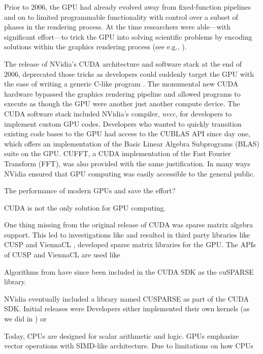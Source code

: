 \documentclass{report}
\begin{document}
Prior to 2006, the GPU had already evolved away from fixed-function pipelines and on to limited programmable functionality with control over a subset of phases in the rendering process. At the time researchers were able---with significant effort---to trick the GPU into solving scientific problems by encoding solutions within the graphics rendering process (see e.g., \cite{Harris2005,Owens2007}). 

The release of NVidia's CUDA architecture and software stack at the end of 2006, deprecated those tricks as developers could suddenly target the GPU with the ease of writing a generic C-like program \cite{CudaGuide2013}. The monumental new CUDA hardware bypassed the graphics rendering pipeline and allowed programs to execute as though the GPU were another just another compute device. The CUDA software stack included NVidia's compiler, \emph{nvcc}, for developers to implement custom GPU codes. Developers who wanted to quickly transition existing code bases to the GPU had access to the CUBLAS API since day one, which offers an implementation of the Basic Linear Algebra Subprograms (BLAS) suite on the GPU. CUFFT, a CUDA implementation of the Fast Fourier Transform (FFT), was also provided with the same justification. In many ways NVidia ensured that GPU computing was easily accessible to the general public. 


The performance of modern GPUs \cite{CudaGuide2013} and save the effort?


CUDA is not the only solution for GPU computing. 


One thing missing from the original release of CUDA was sparse matrix algebra support. 
This led to investigations like \cite{Bell2009,SuKeutzer2012} and resulted in third party libraries like CUSP \cite{Cusp2012} and ViennaCL \cite{Rupp2010,Rupp2010a}, developed sparse matrix libraries for the GPU. The APIs of CUSP and ViennaCL are used like 

Algorithms from \cite{Bell2009} have since been included in the CUDA SDK as the cuSPARSE library. 

NVidia eventually included a library named CUSPARSE as part of the CUDA SDK. Initial releases were 
Developers either implemented their own kernels (as we did in \cite{BolligFlyerErlebacher2012}) or   



Today, CPUs are designed for scalar arithmetic and logic. GPUs emphasize vector operations with SIMD-like architecture. 
Due to limitations on how CPUs 
\end{document}
